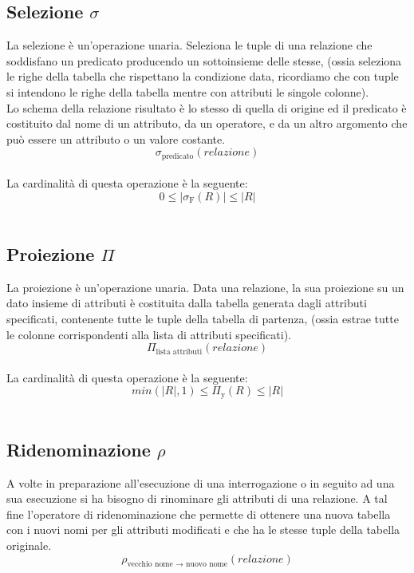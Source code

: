 \documentclass{report}
\begin{document}
\subsection{Selezione $\sigma$}
La selezione è un'operazione unaria. Seleziona le tuple di una relazione che soddisfano un predicato producendo un sottoinsieme delle stesse, (ossia seleziona le righe della tabella che rispettano la condizione data, ricordiamo che con tuple si intendono le righe della tabella mentre con attributi le singole colonne).\\
Lo schema della relazione risultato è lo stesso di quella di origine ed il predicato è costituito dal nome di un attributo, da un operatore, e da un altro argomento che può essere un attributo o un valore
costante.\\
$$\sigma_{\text{predicato}}(relazione)$$\\
La cardinalità di questa operazione è la seguente:\\
$$ 0 \leq |\sigma_{\text{F}}(R)| \leq |R|$$\\

\subsection{Proiezione $\Pi$}
La proiezione è un'operazione unaria. Data una relazione, la sua proiezione su un dato insieme di attributi è costituita dalla tabella generata dagli attributi specificati, contenente tutte le tuple della tabella di partenza, (ossia estrae tutte le colonne corrispondenti alla lista di attributi specificati).\\
$$\Pi_{\text{lista attributi}}(relazione)$$\\
La cardinalità di questa operazione è la seguente:\\
$$min(|R|, 1) \leq \Pi_{\text{y}}(R) \leq |R|$$\\

\subsection{Ridenominazione $\rho$}
A volte in preparazione all’esecuzione di una interrogazione o in seguito ad una sua esecuzione si ha bisogno di rinominare gli attributi di una relazione. A tal fine l’operatore di ridenominazione che permette di ottenere una nuova tabella con i nuovi nomi per gli attributi modificati e che ha le stesse tuple della tabella originale.\\
$$\rho_{\text{vecchio nome $\to$ nuovo nome}}(relazione)$$\\
\end{document}
